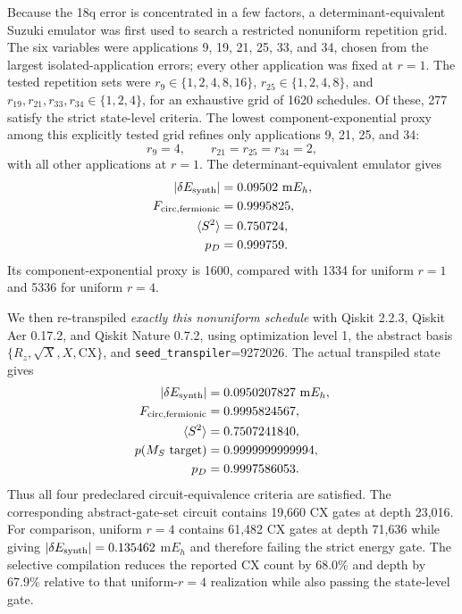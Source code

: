 \documentclass[
 aip,
 jcp,
 amsmath,amssymb,
 preprint
]{revtex4-2}
\begin{document}
Because the 18q error is concentrated in a few factors, a determinant-equivalent Suzuki emulator was first used to search a restricted nonuniform repetition grid.
The six variables were applications 9, 19, 21, 25, 33, and 34, chosen from the largest isolated-application errors; every other application was fixed at $r=1$.
The tested repetition sets were
$r_9\in\{1,2,4,8,16\}$,
$r_{25}\in\{1,2,4,8\}$, and
$r_{19},r_{21},r_{33},r_{34}\in\{1,2,4\}$,
for an exhaustive grid of 1620 schedules.
Of these, 277 satisfy the strict state-level criteria.
The lowest component-exponential proxy among this explicitly tested grid refines only applications 9, 21, 25, and 34:
\begin{equation}
r_9=4,\qquad r_{21}=r_{25}=r_{34}=2,
\end{equation}
with all other applications at $r=1$.
The determinant-equivalent emulator gives
\begin{align}
|\delta E_{\rm synth}|&=0.09502~{\rm m}E_h,\\
F_{\rm circ,fermionic}&=0.9995825,\\
\langle S^2\rangle&=0.750724,\\
p_D&=0.999759.
\end{align}
Its component-exponential proxy is 1600, compared with 1334 for uniform $r=1$ and 5336 for uniform $r=4$.

We then re-transpiled \emph{exactly this nonuniform schedule} with Qiskit 2.2.3, Qiskit Aer 0.17.2, and Qiskit Nature 0.7.2, using optimization level 1, the abstract basis
$\{R_z,\sqrt X,X,\mathrm{CX}\}$, and \texttt{seed\_transpiler}=9272026.
The actual transpiled state gives
\begin{align}
|\delta E_{\rm synth}|&=0.0950207827~{\rm m}E_h,\\
F_{\rm circ,fermionic}&=0.9995824567,\\
\langle S^2\rangle&=0.7507241840,\\
p(M_S\text{ target})&=0.9999999999994,\\
p_D&=0.9997586053.
\end{align}
Thus all four predeclared circuit-equivalence criteria are satisfied.
The corresponding abstract-gate-set circuit contains 19,660 CX gates at depth 23,016.
For comparison, uniform $r=4$ contains 61,482 CX gates at depth 71,636 while giving
$|\delta E_{\rm synth}|=0.135462$ m$E_h$ and therefore failing the strict energy gate.
The selective compilation reduces the reported CX count by 68.0\% and depth by 67.9\% relative to that uniform-$r=4$ realization while also passing the state-level gate.
\end{document}
